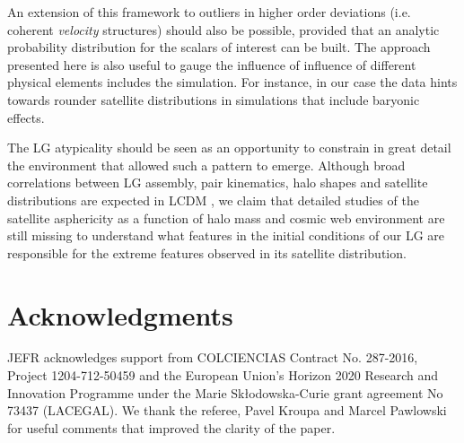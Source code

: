 \documentclass[a4paper,fleqn,usenatbib]{mnras}
\begin{document}
An extension of this framework to outliers in higher order deviations
(i.e. coherent \emph{velocity} structures) should also be possible, 
provided that an analytic probability distribution for the scalars of
interest can be built.  
The approach presented here is also useful to gauge the influence of 
influence of different physical elements includes the simulation. 
For instance, in our case the data hints towards rounder satellite
distributions in simulations that include baryonic effects.  

The LG atypicality should be seen as an opportunity to constrain in
great detail the environment that allowed such a pattern to emerge. 
Although broad correlations between LG assembly, pair kinematics, halo
shapes and satellite distributions are expected in LCDM
\citep{2011MNRAS.417.1434F,2014MNRAS.443.1090F,2015ApJ...799...45F,2015MNRAS.452.1052L},
we claim that detailed studies of the satellite asphericity as a
function of halo mass and cosmic web environment are still missing to
understand what features in the initial conditions of our LG are
responsible for the extreme features observed in its satellite
distribution. 

\section*{Acknowledgments} 
JEFR acknowledges support from COLCIENCIAS Contract No. 287-2016,
Project 1204-712-50459 and the European Union's Horizon 2020 Research and Innovation
Programme under the Marie Sk\l{}odowska-Curie grant agreement No 73437
(LACEGAL).   
We thank the referee, Pavel Kroupa and Marcel Pawlowski for useful
comments that improved the clarity of the paper.
  
\end{document}
